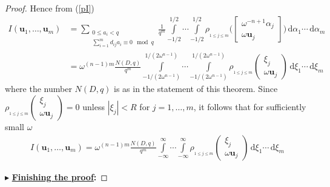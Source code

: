 \documentclass[11pt]{article}
\theoremstyle{definition}
\theoremstyle{proof}
\begin{document}
\begin{proof}
    Hence from (\ref{pI})
    \begin{align*}
        I(\bm{u}_1, \ldots, \bm{u}_m) &= \sum\limits_{\substack{0 \leq a_i < q \\ \sum\limits_{i=1}^{m} d_{ij}a_i \equiv 0 \mod q}} \frac{1}{q^m} \int\limits_{-1/2}^{1/2} \cdots \int\limits_{-1/2}^{1/2} \rho _{_{1 \leq j \leq m}} \bigg(
        \begin{bmatrix}
            \omega ^{-n+1} \alpha _j \\
            \omega \bm{u}_j
        \end{bmatrix}
        \bigg) \, \mathrm{d} \alpha _1 \cdots \, \mathrm{d} \alpha _m \\
        &= \omega ^{(n-1)m}\frac{N(D, q)}{q^m} \int\limits_{-1/(2 \omega ^{n-1})}^{1/(2 \omega ^{n-1})} \cdots \int\limits_{-1/(2 \omega ^{n-1})}^{1/(2 \omega ^{n-1})} \rho _{_{1 \leq j \leq m}}
        \begin{pmatrix}
            \xi _j \\
            \omega \bm{u}_j
        \end{pmatrix}
        \, \mathrm{d} \xi _1 \cdots \, \mathrm{d} \xi _m
    \end{align*}
    where the number $N(D, q)$ is as in the statement of this theorem.
    Since $\rho _{_{1 \leq j \leq m}}
    \begin{pmatrix}
        \xi _j \\
        \omega \bm{u}_j
    \end{pmatrix}
    = 0 $ unless $|\xi _j| < R$ for $j = 1, \ldots, m$, it follows that for sufficiently small $\omega$
    \begin{align}\label{I}
        I(\bm{u}_1, \ldots, \bm{u}_m) = \omega ^{(n-1)m} \frac{N(D, q)}{q^m} \int\limits_{-\infty}^{\infty} \cdots \int\limits_{-\infty}^{\infty} \rho _{_{1 \leq j \leq m}}
        \begin{pmatrix}
            \xi _j \\
            \omega \bm{u}_j
        \end{pmatrix}
        \, \mathrm{d} \xi _1 \cdots \, \mathrm{d} \xi _m
    \end{align}

    $\blacktriangleright$ \textbf{\uline{Finishing the proof}:}


\end{proof}
\end{document}
